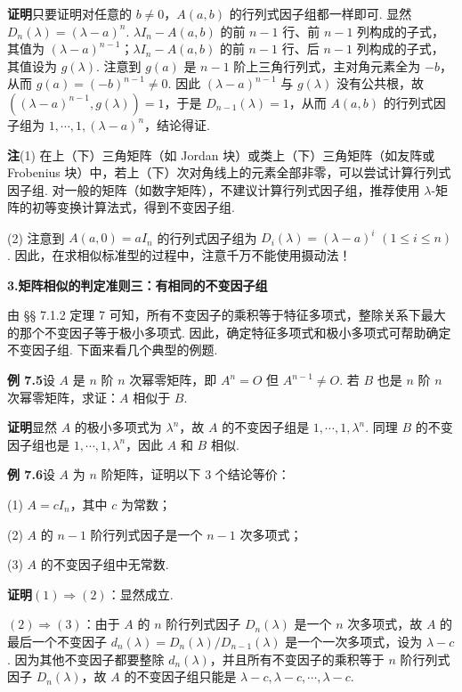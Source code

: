 \documentclass[UTF8, 12pt, fontset=fandol, oneside]{ctexart}
\begin{document}
\noindent\textbf{证明}\quad 只要证明对任意的 $b\ne 0$，$A(a,b)$ 的行列式因子组都一样即可. 显然 $D_n(\lambda)=(\lambda-a)^n$. $\lambda I_n-A(a,b)$ 的前 $n-1$ 行、前 $n-1$ 列构成的子式，其值为 $(\lambda-a)^{n-1}$；$\lambda I_n-A(a,b)$ 的前 $n-1$ 行、后 $n-1$ 列构成的子式，其值设为 $g(\lambda)$. 注意到 $g(a)$ 是 $n-1$ 阶上三角行列式，主对角元素全为 $-b$，从而 $g(a)=(-b)^{n-1}\ne 0$. 因此 $(\lambda-a)^{n-1}$ 与 $g(\lambda)$ 没有公共根，故 $((\lambda-a)^{n-1},g(\lambda))=1$，于是 $D_{n-1}(\lambda)=1$，从而 $A(a,b)$ 的行列式因子组为 $1,\cdots,1,(\lambda-a)^n$，结论得证.

\noindent\textbf{注}\quad (1) 在上（下）三角矩阵（如 Jordan 块）或类上（下）三角矩阵（如友阵或 Frobenius 块）中，若上（下）次对角线上的元素全部非零，可以尝试计算行列式因子组. 对一般的矩阵（如数字矩阵），不建议计算行列式因子组，推荐使用 $\lambda$-矩阵的初等变换计算法式，得到不变因子组.

(2) 注意到 $A(a,0)=aI_n$ 的行列式因子组为 $D_i(\lambda)=(\lambda-a)^i$ $(1\le i\le n)$. 因此，在求相似标准型的过程中，注意千万不能使用摄动法！

\noindent\textbf{3.\quad 矩阵相似的判定准则三：有相同的不变因子组}

由 §§ 7.1.2 定理 7 可知，所有不变因子的乘积等于特征多项式，整除关系下最大的那个不变因子等于极小多项式. 因此，确定特征多项式和极小多项式可帮助确定不变因子组. 下面来看几个典型的例题.

\noindent\textbf{例 7.5}\quad 设 $A$ 是 $n$ 阶 $n$ 次幂零矩阵，即 $A^n=O$ 但 $A^{n-1}\ne O$. 若 $B$ 也是 $n$ 阶 $n$ 次幂零矩阵，求证：$A$ 相似于 $B$.

\noindent\textbf{证明}\quad 显然 $A$ 的极小多项式为 $\lambda^n$，故 $A$ 的不变因子组是 $1,\cdots,1,\lambda^n$. 同理 $B$ 的不变因子组也是 $1,\cdots,1,\lambda^n$，因此 $A$ 和 $B$ 相似.

\noindent\textbf{例 7.6}\quad 设 $A$ 为 $n$ 阶矩阵，证明以下 3 个结论等价：

(1) $A=cI_n$，其中 $c$ 为常数；

(2) $A$ 的 $n-1$ 阶行列式因子是一个 $n-1$ 次多项式；

(3) $A$ 的不变因子组中无常数.

\noindent\textbf{证明}\quad $(1)\Rightarrow(2)$：显然成立.

$(2)\Rightarrow(3)$：由于 $A$ 的 $n$ 阶行列式因子 $D_n(\lambda)$ 是一个 $n$ 次多项式，故 $A$ 的最后一个不变因子 $d_n(\lambda)=D_n(\lambda)/D_{n-1}(\lambda)$ 是一个一次多项式，设为 $\lambda-c$. 因为其他不变因子都要整除 $d_n(\lambda)$，并且所有不变因子的乘积等于 $n$ 阶行列式因子 $D_n(\lambda)$，故 $A$ 的不变因子组只能是 $\lambda-c,\lambda-c,\cdots,\lambda-c$.
\end{document}
